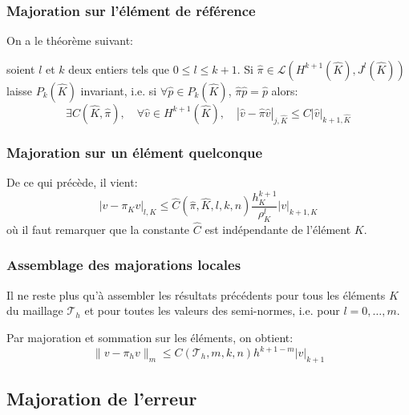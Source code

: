 \medskip
\subsubsection{Majoration sur l'élément de référence}
On a le théorème suivant:

\begin{theoreme}
soient $l$ et $k$ deux entiers tels que $0\le l\le k+1$.
Si $\hat{\pi}\in\mathcal{L}(H^{k+1}(\hat{K}),J^l(\hat{K}))$ laisse
$P_k(\hat{K})$ invariant, i.e. si $\forall \hat{p}\in P_k(\hat{K})$, $\hat{\pi}\hat{p}=\hat{p}$ alors:
\begin{equation}
\exists C(\hat{K},\hat{\pi}),\quad \forall \hat{v}\in H^{k+1}(\hat{K}),\quad |\hat{v}-\hat{\pi}\hat{v}|_{j,\hat{K}}
\le C |\hat{v}|_{k+1,\hat{K}}
\end{equation}
\end{theoreme}

\medskip
\subsubsection{Majoration sur un élément quelconque}
De ce qui précède, il vient:
\begin{equation}
|v-\pi_Kv|_{l,K}\le \hat{C}(\hat{\pi},\hat{K},l,k,n) \dfrac{h_K^{k+1}}{\rho_K^l} |v|_{k+1,K}
\end{equation}
où il faut remarquer que la constante $\hat{C}$ est indépendante de l'élément $K$.

\medskip
\subsubsection{Assemblage des majorations locales}
Il ne reste plus qu'à assembler les résultats précédents pour tous les éléments $K$
du maillage $\mathcal{T}_h$ et pour toutes les valeurs des semi-normes, i.e. pour $l=0,\ldots, m$.

\medskip
Par majoration et sommation sur les éléments, on obtient:
\begin{equation}
\|v-\pi_hv\|_m\le C(\mathcal{T}_h,m,k,n) h^{k+1-m} |v|_{k+1}
\end{equation}

\normalsize
\medskip
\subsection{Majoration de l'erreur}

